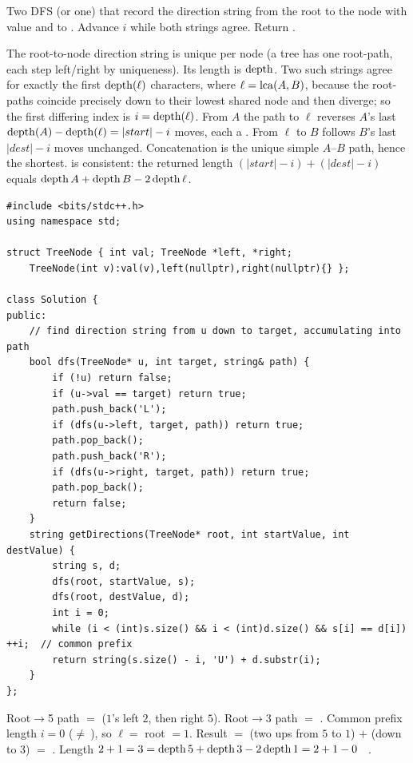 Two DFS (or one) that record the direction string from the root to the node with value
 and to . Advance $i$ while both strings agree. Return
.

\begin{proofbox}
The root-to-node direction string is unique per node (a tree has one root-path, each step
left/right by  uniqueness). Its length is $\operatorname{depth}$. Two such strings agree for
exactly the first $\operatorname{depth}(\ell)$ characters, where $\ell=\operatorname{lca}(A,B)$, because the root-paths
coincide precisely down to their lowest shared node and then diverge; so the first differing
index is $i=\operatorname{depth}(\ell)$. From $A$ the path to $\ell$ reverses $A$'s last
$\operatorname{depth}(A)-\operatorname{depth}(\ell)=|start|-i$ moves, each a . From $\ell$ to $B$ follows $B$'s
last $|dest|-i$ moves unchanged. Concatenation is the unique simple $A$--$B$ path, hence the
shortest.  is consistent: the returned length
$(|start|-i)+(|dest|-i)$ equals $\operatorname{depth} A + \operatorname{depth} B - 2\operatorname{depth}\ell$.
\end{proofbox}

\begin{lstlisting}[caption={Step-By-Step Directions via root-path LCA (LeetCode 2096)}, label={lst:c24-pathdir}]
#include <bits/stdc++.h>
using namespace std;

struct TreeNode { int val; TreeNode *left, *right;
    TreeNode(int v):val(v),left(nullptr),right(nullptr){} };

class Solution {
public:
    // find direction string from u down to target, accumulating into path
    bool dfs(TreeNode* u, int target, string& path) {
        if (!u) return false;
        if (u->val == target) return true;
        path.push_back('L');
        if (dfs(u->left, target, path)) return true;
        path.pop_back();
        path.push_back('R');
        if (dfs(u->right, target, path)) return true;
        path.pop_back();
        return false;
    }
    string getDirections(TreeNode* root, int startValue, int destValue) {
        string s, d;
        dfs(root, startValue, s);
        dfs(root, destValue, d);
        int i = 0;
        while (i < (int)s.size() && i < (int)d.size() && s[i] == d[i]) ++i;  // common prefix
        return string(s.size() - i, 'U') + d.substr(i);
    }
};
\end{lstlisting}

\begin{tracebox}[$R$, \figref{c03-running}: start$=5$, dest$=3$]
Root$\to$5 path $=$  ($1$'s left $2$, then right $5$). Root$\to$3 path $=$
. Common prefix length $i=0$ ($\ne\ $), so $\ell=$ root $=1$.
Result $=$  (two ups from $5$ to $1$) $+$  (down to $3$) $=$
. Length $2+1=3=\operatorname{depth}5+\operatorname{depth}3-2\operatorname{depth}1=2+1-0$ \checkmark\
.
\end{tracebox}

